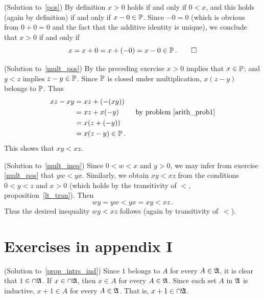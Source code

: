 \begin{prf}\label{sol_pos}(Solution to~\ref{pos})
By definition $x > 0$ holds if and only if $0 < x$, and this holds (again by definition) if
and only if $x - 0 \in \mathbb{P}$. Since $-0 = 0$ (which is obvious from $0 + 0 = 0$ and the fact
that the additive identity is unique), we conclude that $x > 0$ if and only if
  \[ x = x + 0 = x + (-0) = x - 0 \in \mathbb{P}\,.   \qedhere \]
\end{prf}

\begin{prf}\label{sol_mult_pos}(Solution to~\ref{mult_pos})
By the preceding exercise $x > 0$ implies that $x \in \mathbb{P}$; and $y < z$ implies $z - y \in
\mathbb{P}$. Since $\mathbb{P}$ is closed under multiplication, $x(z - y)$ belongs to $\mathbb{P}$. Thus
  \begin{align*}
       xz - xy  &= xz + (-(xy)) \\
                &= xz + x(-y) \qquad\text{ by problem~\ref{arith_prob1}} \\
                &= x(z + (-y)) \\
                &= x(z - y) \in \mathbb{P}\,.
  \end{align*}
This shows that $xy < xz$.
\end{prf}

\begin{prf}\label{sol_mult_ineq}(Solution to~\ref{mult_ineq})
Since $0 < w < x$ and $y > 0$, we may infer from exercise \ref{mult_pos} that $yw < yx$.
Similarly, we obtain $xy < xz$ from the conditions $0 < y < z$ and $x > 0$ (which holds by the
transitivity of $<$, proposition~\ref{lt_tran}). Then
  \[ wy = yw < yx = xy < xz\,. \]
Thus the desired inequality $wy < xz$ follows (again by transitivity of~$<$).
\end{prf}






















\section{Exercises in appendix I}

\begin{prf}\label{sol_prop_intrs_ind}(Solution to~\ref{prop_intrs_ind})
Since $1$ belongs to $A$ for every $A \in \mathfrak{A}$, it is clear that $1 \in \cap\mathfrak{A}$.
If $x \in \cap\mathfrak{A}$, then $x \in A$ for every $A \in \mathfrak{A}$. Since each set $A$ in
$\mathfrak{A}$ is inductive, $x + 1 \in A$ for every $A \in \mathfrak{A}$.  That is, $x + 1 \in
\cap\mathfrak{A}$.
\end{prf}

